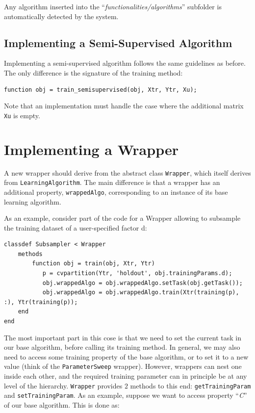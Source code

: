 Any algorithm inserted into the ``\textit{functionalities/algorithms}'' subfolder is automatically detected by the system.

\subsection{Implementing a Semi-Supervised Algorithm}

Implementing a semi-supervised algorithm follows the same guidelines as before. The only difference is the signature of the training method:

\begin{lstlisting}
function obj = train_semisupervised(obj, Xtr, Ytr, Xu);
\end{lstlisting}

Note that an implementation must handle the case where the additional matrix \verb|Xu| is empty.

\section{Implementing a Wrapper}

A new wrapper should derive from the abstract class \verb|Wrapper|, which itself derives from \verb|LearningAlgorithm|. The main difference is that a wrapper has an additional property, \verb|wrappedAlgo|, corresponding to an instance of its base learning algorithm.

As an example, consider part of the code for a Wrapper allowing to subsample the training dataset of a user-specified factor d:

\begin{lstlisting}
classdef Subsampler < Wrapper
	methods
		function obj = train(obj, Xtr, Ytr)
		   p = cvpartition(Ytr, 'holdout', obj.trainingParams.d);
		   obj.wrappedAlgo = obj.wrappedAlgo.setTask(obj.getTask());
		   obj.wrappedAlgo = obj.wrappedAlgo.train(Xtr(training(p), :), Ytr(training(p));
	end
end
\end{lstlisting}

The most important part in this cose is that we need to set the current task in our base algorithm, before calling its training method. In general, we may also need to access some training property of the base algorithm, or to set it to a new value (think of the \verb|ParameterSweep| wrapper). However, wrappers can nest one inside each other, and the required training parameter can in principle be at any level of the hierarchy. \verb|Wrapper| provides $2$ methods to this end: \verb|getTrainingParam| and \verb|setTrainingParam|. As an example, suppose we want to access property ``\textit{C}'' of our base algorithm. This is done as:

